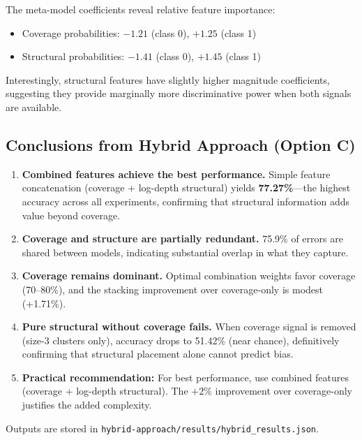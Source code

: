 \documentclass[12pt,a4paper]{article}
\begin{document}
The meta-model coefficients reveal relative feature importance:
\begin{itemize}
\item Coverage probabilities: $-1.21$ (class 0), $+1.25$ (class 1)
\item Structural probabilities: $-1.41$ (class 0), $+1.45$ (class 1)
\end{itemize}

Interestingly, structural features have slightly higher magnitude coefficients,
suggesting they provide marginally more discriminative power when both signals are available.

\subsection{Conclusions from Hybrid Approach (Option C)}

\begin{enumerate}
\item \textbf{Combined features achieve the best performance.}
      Simple feature concatenation (coverage + log-depth structural) yields \textbf{77.27\%}---the
      highest accuracy across all experiments, confirming that structural information adds
      value beyond coverage.

\item \textbf{Coverage and structure are partially redundant.}
      75.9\% of errors are shared between models, indicating substantial overlap in
      what they capture.

\item \textbf{Coverage remains dominant.}
      Optimal combination weights favor coverage (70--80\%), and the stacking improvement
      over coverage-only is modest (+1.71\%).

\item \textbf{Pure structural without coverage fails.}
      When coverage signal is removed (size-3 clusters only), accuracy drops to 51.42\%
      (near chance), definitively confirming that structural placement alone cannot predict bias.

\item \textbf{Practical recommendation:}
      For best performance, use combined features (coverage + log-depth structural).
      The $+2\%$ improvement over coverage-only justifies the added complexity.
\end{enumerate}

Outputs are stored in \texttt{hybrid-approach/results/hybrid\_results.json}.
\end{document}
